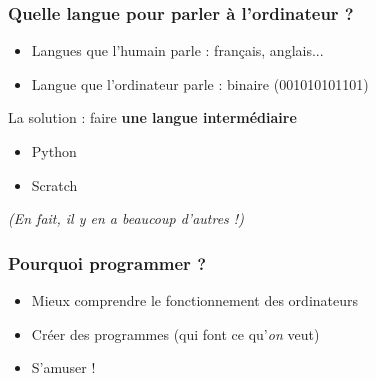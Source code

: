 \documentclass{beamer}
\begin{document}
\begin{frame}
    \frametitle{Quelle langue pour parler à l'ordinateur ?}
    \begin{itemize}
        \item Langues que l'humain parle : français, anglais... \pause
        \item Langue que l'ordinateur parle : binaire (001010101101)
    \end{itemize}
    
    \pause

    La solution : faire \textbf{une langue intermédiaire}
    \begin{itemize}
        \item Python
        \item Scratch
    \end{itemize}

    \begin{scriptsize}\textit{(En fait, il y en a beaucoup d'autres !)}\end{scriptsize}
\end{frame}

\begin{frame}
    \frametitle{Pourquoi programmer ?}
    \begin{itemize}
        \item Mieux comprendre le fonctionnement des ordinateurs \pause
        \item Créer des programmes (qui font ce qu'\textit{on} veut) \pause
        \item S'amuser !
    \end{itemize}
\end{frame}
\end{document}
